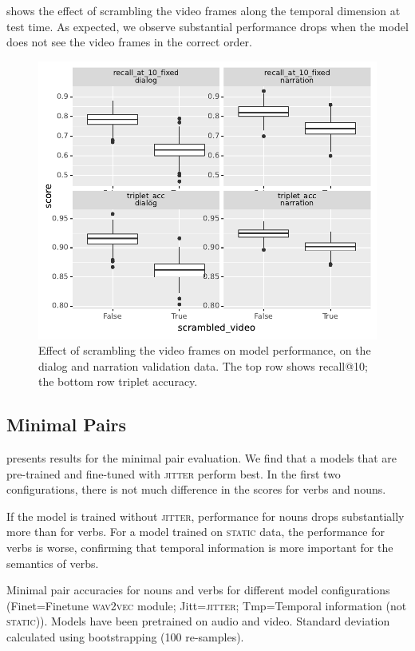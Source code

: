  shows the effect of scrambling the video frames 
along the temporal dimension at test time. As expected, we observe substantial 
performance drops when the model does not see the video frames in 
the correct order.
\begin{figure}[htb]
	\centering
	\includegraphics[width=\columnwidth]{results/ablations/scrambled_video.pdf}
	\caption{Effect of scrambling the video frames on model performance, on the 
	dialog and narration validation data. The top row shows recall@10;
		the bottom row triplet accuracy.}
	\label{fig:scrambled_video}
\end{figure}

\subsection{Minimal Pairs}
\label{sec:minimal-pairs}


 presents results for the minimal pair 
evaluation. We find that a models that are 
pre-trained and fine-tuned with \textsc{jitter} perform best. In the first two 
configurations, there is not much difference in the scores for verbs and nouns.

If the model is trained without \textsc{jitter}, performance for nouns drops 
substantially more than for verbs. For a model trained on \textsc{static} data, 
the performance for verbs is worse, confirming that temporal information is 
more important for the semantics 
of verbs.
\begin{table}[htb]
	\caption{Minimal pair accuracies for nouns and verbs for different model 
	configurations (Finet=Finetune \textsc{wav2vec} module; 
	Jitt=\textsc{jitter}; Tmp=Temporal information (not \textsc{static})). 
	Models have been pretrained on audio and video. Standard deviation 
	calculated using bootstrapping (100 re-samples).}
	\label{tab:minimal_pair_results}
	
\end{table}

